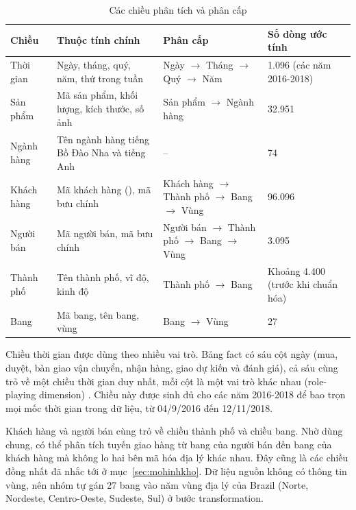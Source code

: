 \begin{table}[H]
\centering
\small{}
\caption{Các chiều phân tích và phân cấp}
\label{tab:chieu}
\begin{tabularx}{\linewidth}{|P{2.2cm}|>{\raggedright\arraybackslash}X|P{4.3cm}|P{2.4cm}|}
\hline
\textbf{Chiều} & \textbf{Thuộc tính chính} & \textbf{Phân cấp} & \textbf{Số dòng ước tính}\\ \hline
Thời gian & Ngày, tháng, quý, năm, thứ trong tuần & Ngày $\rightarrow$ Tháng $\rightarrow$ Quý $\rightarrow$ Năm & 1.096 (các năm 2016-2018)\\ \hline
Sản phẩm & Mã sản phẩm, khối lượng, kích thước, số ảnh & Sản phẩm $\rightarrow$ Ngành hàng & 32.951\\ \hline
Ngành hàng & Tên ngành hàng tiếng Bồ Đào Nha và tiếng Anh & -- & 74\\ \hline
Khách hàng & Mã khách hàng (), mã bưu chính & Khách hàng $\rightarrow$ Thành phố $\rightarrow$ Bang $\rightarrow$ Vùng & 96.096\\ \hline
Người bán & Mã người bán, mã bưu chính & Người bán $\rightarrow$ Thành phố $\rightarrow$ Bang $\rightarrow$ Vùng & 3.095\\ \hline
Thành phố & Tên thành phố, vĩ độ, kinh độ & Thành phố $\rightarrow$ Bang & Khoảng 4.400 (trước khi chuẩn hóa)\\ \hline
Bang & Mã bang, tên bang, vùng & Bang $\rightarrow$ Vùng & 27\\ \hline
\end{tabularx}
\end{table}



Chiều thời gian được dùng theo nhiều vai trò. Bảng fact có sáu cột ngày (mua, duyệt, bàn giao vận chuyển, nhận hàng, giao dự kiến và đánh giá), cả sáu cùng trỏ về một chiều thời gian duy nhất, mỗi cột là một vai trò khác nhau (role-playing dimension) \cite{kimball}. Chiều này được sinh đủ cho các năm 2016-2018 để bao trọn mọi mốc thời gian trong dữ liệu, từ 04/9/2016 đến 12/11/2018.

Khách hàng và người bán cùng trỏ về chiều thành phố và chiều bang. Nhờ dùng chung, có thể phân tích tuyến giao hàng từ bang của người bán đến bang của khách hàng mà không lo hai bên mã hóa địa lý khác nhau. Đây cũng là các chiều đồng nhất đã nhắc tới ở mục~\ref{sec:mohinhkho}. Dữ liệu nguồn không có thông tin vùng, nên nhóm tự gán 27 bang vào năm vùng địa lý của Brazil (Norte, Nordeste, Centro-Oeste, Sudeste, Sul) ở bước transformation.


